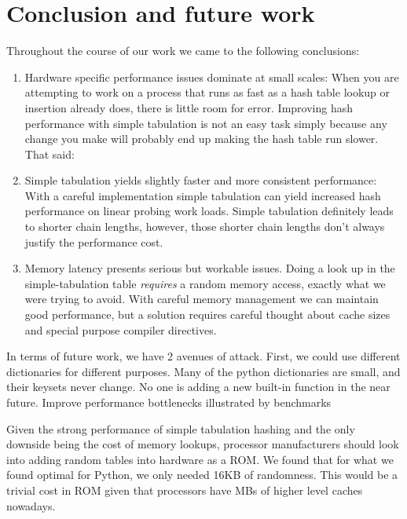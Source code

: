 \documentclass[11pt]{article}
\begin{document}
\section{Conclusion and future work}
Throughout the course of our work we came to the following conclusions:
\begin{enumerate}
\item Hardware specific performance issues dominate at small scales: When you are attempting to work on a process that runs as fast as a hash table lookup or insertion already does, there is little room for error.  Improving hash performance with simple tabulation is not an easy task simply because any change you make will probably end up making the hash table run slower.  That said:

\item Simple tabulation yields slightly faster and more consistent performance: With a careful implementation simple tabulation can yield increased hash performance on linear probing work loads. Simple tabulation definitely leads to shorter chain lengths, however, those shorter chain lengths don’t always justify the performance cost.

\item Memory latency presents serious but workable issues.  Doing a look up in the simple-tabulation table \emph{requires} a random memory access, exactly what we were trying to avoid. With careful memory management we can maintain good performance, but a solution requires careful thought about cache sizes and special purpose compiler directives.

\end{enumerate}

In terms of future work, we have 2 avenues of attack. First, we could use different dictionaries for different purposes. Many of the python dictionaries are small, and their keysets never change. No one is adding a new built-in function in the near future. 
Improve performance bottlenecks illustrated by benchmarks


Given the strong performance of simple tabulation hashing and the only downside
being the cost of memory lookups, processor manufacturers should look into
adding random tables into hardware as a ROM.  We found that for what we found
optimal for Python, we only needed 16KB of randomness.  This would be a trivial
cost in ROM given that processors have MBs of higher level caches nowadays.

\appendix
\end{document}
